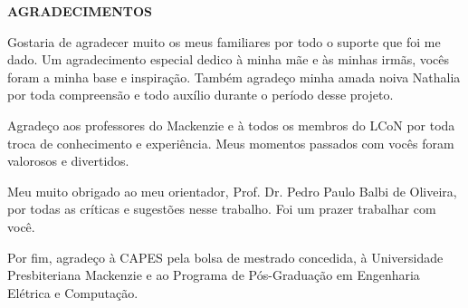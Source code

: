 \newpage
\pagestyle{empty}
\large
\textbf{AGRADECIMENTOS}

Gostaria de agradecer muito os meus familiares por todo o suporte que foi me dado. 
Um agradecimento especial dedico à minha mãe e às minhas irmãs, vocês foram a minha base e inspiração. Também agradeço minha amada noiva Nathalia por toda compreensão e todo auxílio durante o período desse projeto.

Agradeço aos professores do Mackenzie e à todos os membros do LCoN por toda troca de conhecimento e experiência. Meus momentos passados com vocês foram valorosos e divertidos.

Meu muito obrigado ao meu orientador, Prof. Dr. Pedro Paulo Balbi de Oliveira, por todas as críticas e sugestões nesse trabalho. Foi um prazer trabalhar com você.

Por fim, agradeço à CAPES pela bolsa de mestrado concedida, à Universidade Presbiteriana Mackenzie e ao Programa de Pós-Graduação em Engenharia Elétrica e Computação.